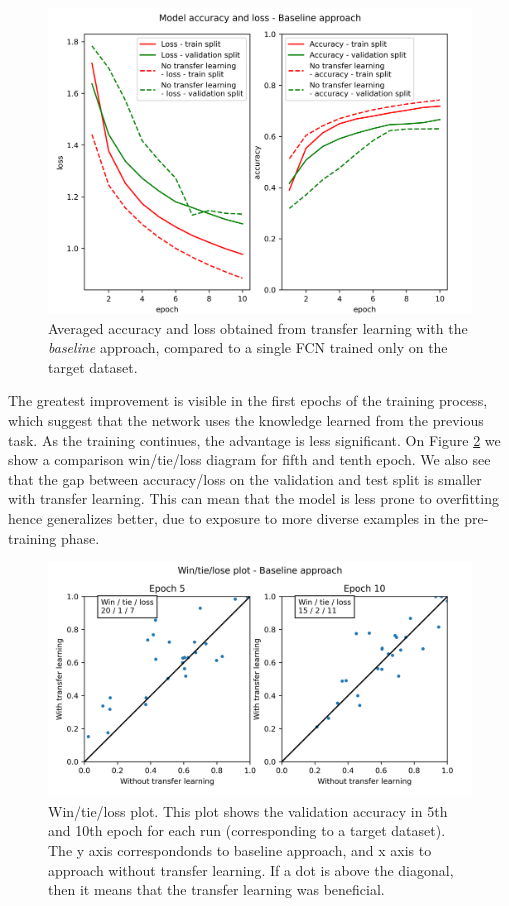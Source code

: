 \documentclass[a4paper,11pt,twoside]{report}
\theoremstyle{definition}
\begin{document}
\begin{figure}[h!t]
\centering
\includegraphics[width=17 cm]{imgs/baseline/loss_acc.png}
\caption{Averaged accuracy and loss obtained from transfer learning with the \textit{baseline} approach, compared to a single FCN trained only on the target dataset.}
\label{fig:baseline_acc}
\end{figure}
\FloatBarrier
The greatest improvement is visible in the first epochs of the training process, which suggest that the network uses the knowledge learned from the previous task. As the training continues, the advantage is less significant. On Figure \ref{fig:win_tie_loss_baseline} we show a comparison win/tie/loss diagram for fifth and tenth epoch.
We also see that the gap between accuracy/loss on the validation and test split is smaller with transfer learning. This can mean that the model is less prone to overfitting hence generalizes better, due to exposure to more diverse examples in the pre-training phase.
\FloatBarrier
\begin{figure}[h!t]
\centering
\includegraphics[width=17 cm]{imgs/baseline/win_tie_lose_epoch.png}
\caption{Win/tie/loss plot. This plot shows the validation accuracy in 5th and 10th epoch for each run (corresponding to a target dataset). The y axis correspondonds to baseline approach, and x axis to approach without transfer learning. If a dot is above the diagonal, then it means that the transfer learning was beneficial.}
\label{fig:win_tie_loss_baseline}
\end{figure}
\end{document}
